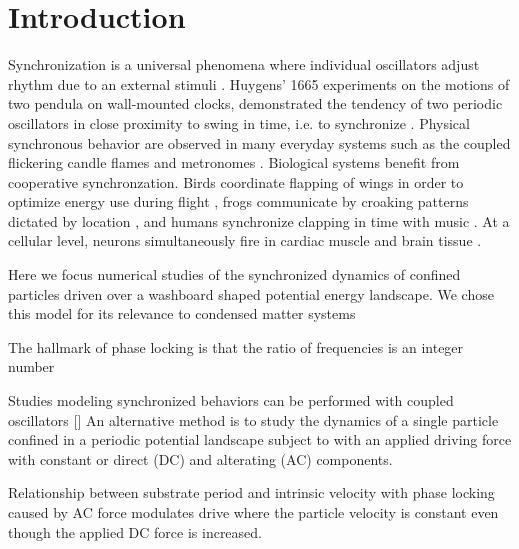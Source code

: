 \documentclass[twocolumn,preprintnumbers,amsmath,amssymb,aps,prx]{revtex4}
\begin{document}
\maketitle %

\section{Introduction} %
%
Synchronization is a universal phenomena
where individual oscillators adjust rhythm due
to an external stimuli \cite{Pikovsky2003}.
Huygens' 1665 experiments on
the 
motions of two pendula on wall-mounted clocks,
demonstrated the tendency of 
two periodic oscillators in close
proximity to swing in time, i.e. to synchronize \cite{Bennett2002}.
Physical synchronous behavior are observed
in many everyday systems
such as the
coupled flickering candle flames \cite{Okamoto2016} 
and metronomes \cite{Jia2015}.
Biological systems benefit from cooperative
synchronzation.
Birds coordinate
flapping of wings in order to optimize energy use during flight \cite{Portugal2014},
frogs communicate by croaking patterns dictated by location \cite{Aihara2014},
and humans synchronize clapping in time with music \cite{Tranchant2016}.
At a cellular level, 
neurons simultaneously fire in cardiac muscle \cite{MartinHall1999}
and brain tissue  \cite{Singer1999}.

Here we focus numerical studies 
of the synchronized dynamics
of confined particles driven over
a washboard shaped potential energy landscape. 
We chose this model for its
relevance to condensed matter systems

The hallmark of phase locking is
that the ratio of frequencies is an integer number \cite{Bak1986}

Studies modeling synchronized behaviors
can be performed with
coupled oscillators []
An alternative method is to
study the dynamics of a single particle
confined in a periodic 
potential landscape subject
to with an applied driving force with constant or direct (DC)
and alterating (AC)
components.

Relationship between substrate period and intrinsic velocity
with phase locking caused by AC force modulates drive
where the particle velocity is constant even though the applied
DC force is increased.
\end{document}

